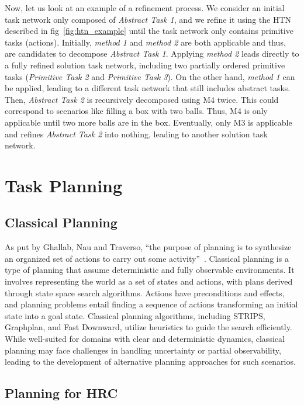 Now, let us look at an example of a refinement process. We consider an initial task network only composed of \emph{Abstract Task 1}, and we refine it using the HTN described in fig~\ref{fig:htn_example} until the task network only contains primitive tasks (actions). Initially, \emph{method 1} and \emph{method 2} are both applicable and thus, are candidates to decompose \emph{Abstract Task 1}. Applying \emph{method 2} leads directly to a fully refined solution task network, including two partially ordered primitive tasks (\emph{Primitive Task 2} and \emph{Primitive Task 3}). On the other hand, \emph{method 1} can be applied, leading to a different task network that still includes abstract tasks. Then, \emph{Abstract Task 2} is recursively decomposed using M4 twice. This could correspond to scenarios like filling a box with two balls. Thus, M4 is only applicable until two more balls are in the box. Eventually, only M3 is applicable and refines \emph{Abstract Task 2} into nothing, leading to another solution task network.

\section{Task Planning}

\subsection{Classical Planning}

As put by Ghallab, Nau and Traverso, “the purpose of planning is to synthesize an organized set of actions to carry out some activity”~\cite{ghallab2016automated}. 
Classical planning is a type of planning that assume deterministic and fully observable environments. It involves representing the world as a set of states and actions, with plans derived through state space search algorithms. Actions have preconditions and effects, and planning problems entail finding a sequence of actions transforming an initial state into a goal state. Classical planning algorithms, including STRIPS, Graphplan, and Fast Downward, utilize heuristics to guide the search efficiently. While well-suited for domains with clear and deterministic dynamics, classical planning may face challenges in handling uncertainty or partial observability, leading to the development of alternative planning approaches for such scenarios.

\subsection{Planning for HRC}

